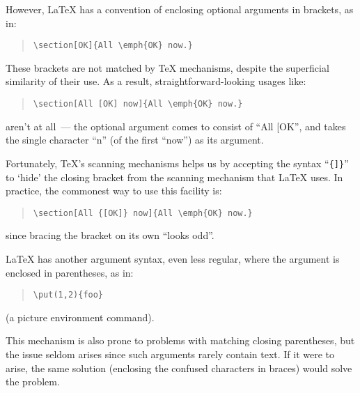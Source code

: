 However, \LaTeX{} has a convention of enclosing optional arguments in
brackets, as in:
\begin{quote}
\begin{verbatim}
\section[OK]{All \emph{OK} now.}
\end{verbatim}
\end{quote}
These brackets are not matched by \TeX{} mechanisms, despite the
superficial similarity of their use.  As a result,
straightforward-looking usages like:
\begin{quote}
\begin{verbatim}
\section[All [OK] now]{All \emph{OK} now.}
\end{verbatim}
\end{quote}
aren't  at all~--- the optional argument comes to consist of
``All [OK'', and  takes the single character ``n'' (of
the first ``now'') as its argument.

Fortunately, \TeX{}'s scanning mechanisms helps us by accepting the
syntax ``\texttt{\{]\}}'' to `hide' the closing bracket from the
scanning mechanism that \LaTeX{} uses.  In practice, the commonest way
to use this facility is:
\begin{quote}
\begin{verbatim}
\section[All {[OK]} now]{All \emph{OK} now.}
\end{verbatim}
\end{quote}
since bracing the bracket on its own ``looks odd''.

\LaTeX{} has another argument syntax, even less regular, where the
argument is enclosed in parentheses, as in:
\begin{quote}
\begin{verbatim}
\put(1,2){foo}
\end{verbatim}
\end{quote}
(a picture environment command).

This mechanism is also prone to problems with matching closing
parentheses, but the issue seldom arises since such arguments rarely
contain text.  If it were to arise, the same solution (enclosing the
confused characters in braces) would solve the problem.

